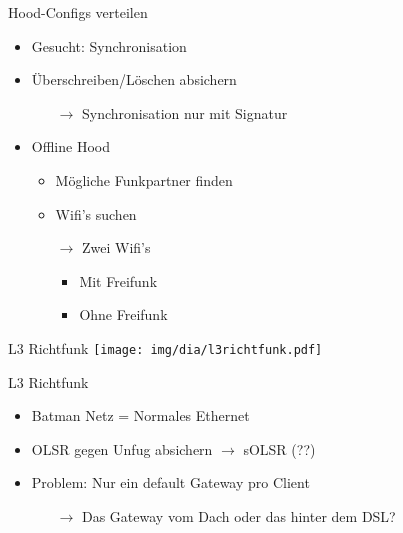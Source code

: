 \begin{frame}{Hood-Configs verteilen}
    \begin{itemize}
        \item Gesucht: Synchronisation
        \item Überschreiben/Löschen absichern
        \begin{itemize}
            \item[$\rightarrow$] Synchronisation nur mit Signatur
        \end{itemize}
        \item Offline Hood
        \begin{itemize}
            \item Mögliche Funkpartner finden
            \item Wifi's suchen
            \item[$\rightarrow$] Zwei Wifi's
            \begin{itemize}
                \item Mit Freifunk
                \item Ohne Freifunk
            \end{itemize}
        \end{itemize}
    \end{itemize}
\end{frame}

\begin{frame}{L3 Richtfunk}
    \center
    \texttt{[image: img/dia/l3richtfunk.pdf]}
\end{frame}

\begin{frame}{L3 Richtfunk}
    \begin{itemize}
        \item Batman Netz = Normales Ethernet
        \item OLSR gegen Unfug absichern $\rightarrow$ sOLSR (??)
        \item Problem: Nur ein default Gateway pro Client
        \begin{itemize}
            \item[$\rightarrow$] Das Gateway vom Dach oder das hinter dem DSL?
        \end{itemize}
    \end{itemize}
\end{frame}
